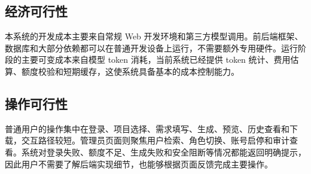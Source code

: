 \subsection{经济可行性}
本系统的开发成本主要来自常规 Web 开发环境和第三方模型调用。前后端框架、数据库和大部分依赖都可以在普通开发设备上运行，不需要额外专用硬件。运行阶段的主要可变成本来自模型 token 消耗，当前系统已经提供 token 统计、费用估算、额度校验和短期缓存，这使系统具备基本的成本控制能力。

\subsection{操作可行性}
普通用户的操作集中在登录、项目选择、需求填写、生成、预览、历史查看和下载，交互路径较短。管理员页面则聚焦用户检索、角色切换、账号启停和审计查看。系统对登录失败、额度不足、生成失败和安全阻断等情况都能返回明确提示，因此用户不需要了解后端实现细节，也能够根据页面反馈完成主要操作。\par




